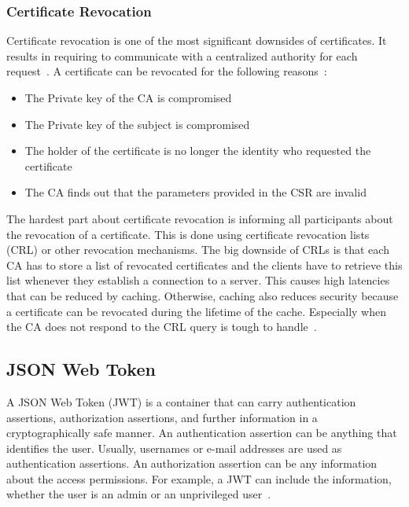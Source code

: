 \subsubsection{Certificate Revocation}
Certificate revocation is one of the most significant downsides of certificates.
It results in requiring to communicate with a centralized authority for each request~\cite{dias2020microservices}.
A certificate can be revocated for the following reasons~\cite{dias2020microservices}: 
\begin{itemize}
    \item The Private key of the CA is compromised
    \item The Private key of the subject is compromised
    \item The holder of the certificate is no longer the identity who requested the certificate 
    \item The CA finds out that the parameters provided in the CSR are invalid
\end{itemize}
The hardest part about certificate revocation is informing all participants about the revocation of a certificate.
This is done using certificate revocation lists (CRL) or other revocation mechanisms.
The big downside of CRLs is that each CA has to store a list of revocated certificates and the clients have to retrieve this list whenever they establish a connection to a server.
This causes high latencies that can be reduced by caching.
Otherwise, caching also reduces security because a certificate can be revocated during the lifetime of the cache.
Especially when the CA does not respond to the CRL query is tough to handle~\cite{dias2020microservices}.


\subsection{JSON Web Token}
A JSON Web Token (JWT) is a container that can carry authentication assertions, authorization assertions, and further information in a cryptographically safe manner.
An authentication assertion can be anything that identifies the user.
Usually, usernames or e-mail addresses are used as authentication assertions.
An authorization assertion can be any information about the access permissions.
For example, a JWT can include the information, whether the user is an admin or an unprivileged user~\cite{dias2020microservices}. 

